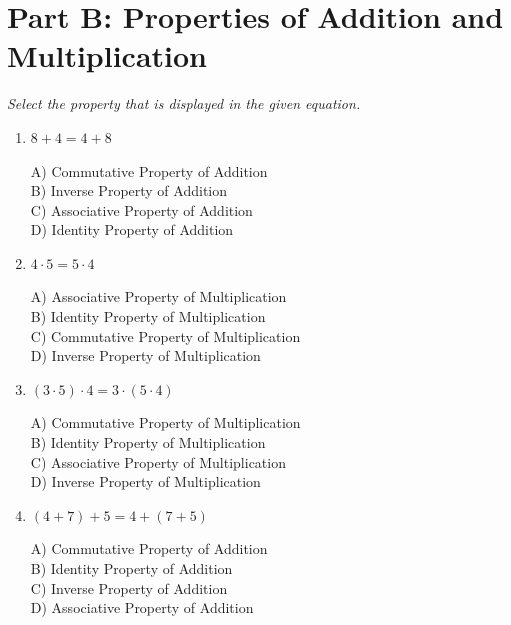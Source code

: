 \documentclass[11pt]{article}
\begin{document}
\section*{Part B: Properties of Addition and Multiplication}
\noindent\textit{Select the property that is displayed in the given equation.}
\begin{enumerate}
  \item $8 + 4 = 4 + 8$
\\[2pt]
\begin{minipage}{\linewidth}
A) Commutative Property of Addition \\
B) Inverse Property of Addition \\
C) Associative Property of Addition \\
D) Identity Property of Addition
\end{minipage}
  \vspace{0.3cm}
  \item $4 \cdot 5 = 5 \cdot 4$
\\[2pt]
\begin{minipage}{\linewidth}
A) Associative Property of Multiplication \\
B) Identity Property of Multiplication \\
C) Commutative Property of Multiplication \\
D) Inverse Property of Multiplication
\end{minipage}
  \vspace{0.3cm}
  \item $(3 \cdot 5) \cdot 4 = 3 \cdot (5 \cdot 4)$
\\[2pt]
\begin{minipage}{\linewidth}
A) Commutative Property of Multiplication \\
B) Identity Property of Multiplication \\
C) Associative Property of Multiplication \\
D) Inverse Property of Multiplication
\end{minipage}
  \vspace{0.3cm}
  \item $(4 + 7) + 5 = 4 + (7 + 5)$
\\[2pt]
\begin{minipage}{\linewidth}
A) Commutative Property of Addition \\
B) Identity Property of Addition \\
C) Inverse Property of Addition \\
D) Associative Property of Addition
\end{minipage}

\end{enumerate}
\end{document}
